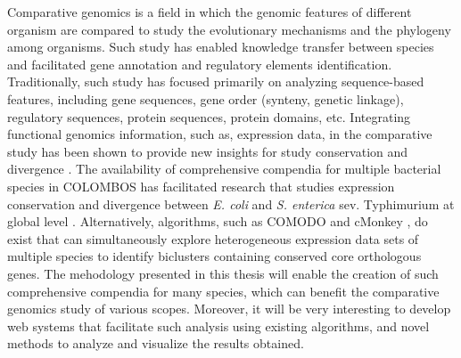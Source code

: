 Comparative genomics is a field in which the genomic features of different
organism are compared to study the evolutionary mechanisms and the phylogeny
among organisms.  Such study has enabled knowledge transfer between species and
facilitated gene annotation and regulatory elements identification.
%
Traditionally, such study has focused primarily on analyzing sequence-based
features, including gene sequences, gene order (synteny, genetic linkage),
regulatory sequences, protein sequences, protein domains, etc.
%
Integrating functional genomics information, such as, expression data, in the
comparative study has been shown to provide new insights for study
conservation and divergence \cite{Bergmann2004}.
%
The availability of comprehensive compendia for multiple bacterial species in
COLOMBOS has facilitated research that studies expression conservation and
divergence between \textit{E. coli} and \textit{S. enterica} sev. Typhimurium
at global level \cite{Meysman2013}.
%
Alternatively, algorithms, such as COMODO \cite{Zarrineh2011} and cMonkey
\cite{Waltman2010}, do exist that can simultaneously explore heterogeneous
expression data sets of multiple species to identify biclusters containing
conserved core orthologous genes.
%
The mehodology presented in this thesis will enable the creation of such
comprehensive compendia for many species, which can benefit the comparative
genomics study of various scopes.
%
Moreover, it will be very interesting to develop web systems that
facilitate such analysis using existing algorithms, and novel methods
to analyze and visualize the results obtained.
%







